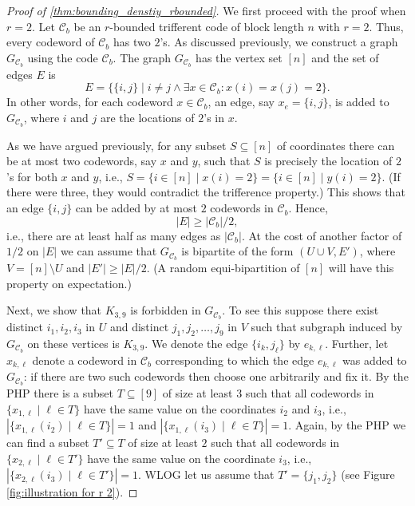 \documentclass[10pt,a4paper]{article}
\newcommand{\rbdtrifferentcodes}{$r$-bounded trifferent code}
\newcommand{\calC}{\mathcal{C}}
\newcommand{\set}[1]{\{#1\}}
\DeclareMathOperator{\1}{\mathbf{1}}
\begin{document}
\begin{proof}[Proof of \cref{thm:bounding_denstiy_rbounded}]
	We first proceed with the proof when $r=2$. Let $\calC_b$ be an \rbdtrifferentcodes{} of block length $n$ with $r=2$.
	Thus, every codeword of $\calC_b$ has two $2$'s.
	As discussed previously, we construct a graph $G_{\calC_b}$ using the code $\calC_b$.
	The graph $G_{\calC_b}$ has the vertex set $[n]$ and the set of edges $E$ is
	$$
		E = \set{\set{i,j}\mid i\neq j \land \exists x\in \calC_b: x(i)=x(j)=2}.
	$$
	In other words, for each codeword $x\in \calC_b$, an edge, say $x_e = \set{i,j}$, is added to $G_{\calC_b}$, where $i$ and $j$ are the locations of $2$'s in $x$.

	As we have argued previously, for any subset $S\subseteq [n]$ of coordinates there can be at most two codewords, say $x$ and $y$, such that $S$ is precisely the location of $2$'s for both $x$ and $y$, i.e., $S=\set{i\in [n]\mid x(i)=2}=\set{i\in [n]\mid y(i)=2}$. (If there were three, they would contradict the trifference property.) 
This shows that an edge $\set{i,j}$ can be added by at most $2$ codewords in $\calC_b$.
	Hence,
	$$
		|E|\geq |\calC_b|/2,
	$$
	i.e., there are at least half as many edges as $|\calC_b|$.
	At the cost of another factor of $1/2$ on $|E|$ we can assume that $G_{\calC_b}$ is bipartite of the form $(U\cup V, E')$, where $V = [n]\setminus U$ and $|E'| \geq |E|/2$.
	(A random equi-bipartition of $[n]$ will have this property on expectation.)

	Next, we show that $K_{3,9}$ is forbidden in $G_{\calC_b}$.
	To see this suppose there exist distinct $i_1,i_2,i_3$ in $U$ and distinct $j_1,j_2,\ldots,j_{9}$ in $V$ such that subgraph induced by $G_{\calC_b}$ on these vertices is $K_{3,9}$.
	We denote the edge $\set{i_k,j_\ell}$ by $e_{k,\ell}$.
	Further, let $x_{k,\ell}$ denote a codeword in $\calC_b$ corresponding to which the edge $e_{k,\ell}$ was added to $G_{\calC_b}$: if there are two such codewords then choose one arbitrarily and fix it.
	By the PHP there is a subset $T\subseteq[9]$ of size at least $3$ such that all codewords in $\set{x_{1,\ell}\mid \ell \in T}$ have the same value on the coordinates $i_2$ and $i_3$, i.e.,  $|\set{x_{1,\ell}(i_2)\mid \ell \in T}|=1$ and  $|\set{x_{1,\ell}(i_3)\mid \ell \in T}|=1$.
	Again, by the PHP we can find a subset $T'\subseteq T$ of size at least $2$ such that all codewords in $\set{x_{2,\ell}\mid \ell \in T'}$ have the same value on the coordinate $i_3$, i.e.,  $|\set{x_{2,\ell}(i_3)\mid \ell \in T'}|=1$.
    WLOG let us assume that $T' = \set{j_1, j_2}$ (see Figure \cref{fig:illustration for r 2}).
 


\end{proof}
\end{document}
